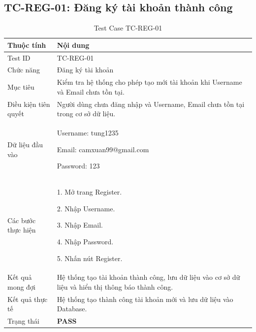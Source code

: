 \subsection{TC-REG-01: Đăng ký tài khoản thành công}

\begin{table}[H]
	\centering
	\caption{Test Case TC-REG-01}
	\label{tab:tc-reg01}
	\renewcommand{\arraystretch}{1.3}
	
	\begin{tabular}{|p{4cm}|p{10cm}|}
		\hline
		\textbf{Thuộc tính} & \textbf{Nội dung} \\ \hline
		
		Test ID
		&
		TC-REG-01
		\\ \hline
		
		Chức năng
		&
		Đăng ký tài khoản
		\\ \hline
		
		Mục tiêu
		&
		Kiểm tra hệ thống cho phép tạo mới tài khoản khi Username và Email chưa tồn tại.
		\\ \hline
		
		Điều kiện tiên quyết
		&
		Người dùng chưa đăng nhập và Username, Email chưa tồn tại trong cơ sở dữ liệu.
		\\ \hline
		
		Dữ liệu đầu vào
		&
		Username: tung1235
		
		Email: camxuan99@gmail.com
		
		Password: 123
		\\ \hline
		
		Các bước thực hiện
		&
		1. Mở trang Register.
		
		2. Nhập Username.
		
		3. Nhập Email.
		
		4. Nhập Password.
		
		5. Nhấn nút Register.
		\\ \hline
		
		Kết quả mong đợi
		&
		Hệ thống tạo tài khoản thành công, lưu dữ liệu vào cơ sở dữ liệu và hiển thị thông báo thành công.
		\\ \hline
		
		Kết quả thực tế
		&
		Hệ thống tạo thành công tài khoản mới và lưu dữ liệu vào Database.
		\\ \hline
		
		Trạng thái
		&
		\textbf{PASS}
		\\ \hline
		
	\end{tabular}
\end{table}

